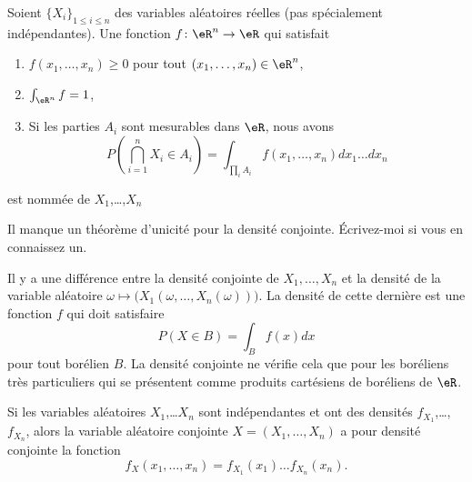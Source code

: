 \begin{definition}      \label{DefFonrepConj}
	Soient \( \{ X_i \}_{1\leq i\leq n}\) des variables aléatoires réelles (pas spécialement indépendantes). Une fonction \( f\colon \eR^n\to \eR\) qui satisfait
	\begin{enumerate}
		\item
		      \( f(x_1,\ldots,x_n)\geq 0\) pour tout \( (x_1,\ldots,x_n)\in\eR^n\),
		\item
		      \( \int_{\eR^n}f=1\),
		\item       \label{ItemDefFonrepConjiii}
		      Si les parties \( A_i\) sont mesurables dans \( \eR\), nous avons
		      \begin{equation}
			      P(\bigcap_{i=1}^n X_i\in A_i)=\int_{\prod_i A_i}f(x_1,\ldots,x_n)dx_1\ldots dx_n
		      \end{equation}
	\end{enumerate}
	est nommée  de \( X_1\),\ldots,\( X_n\)
\end{definition}

\begin{probleme}		\label{PROBooPVIXooNLpmIn}
	Il manque un théorème d'unicité pour la densité conjointe. Écrivez-moi si vous en connaissez un.
\end{probleme}

\begin{normaltext}
	Il y a une différence entre la densité conjointe de \( X_1,\ldots,X_n\) et la densité de la variable aléatoire \( \omega\mapsto \big( X_1(\omega,\ldots,X_n(\omega)) \big)\). La densité de cette dernière est une fonction \( f\) qui doit satisfaire
	\begin{equation}
		P(X\in B)=\int_Bf(x)dx
	\end{equation}
	pour tout borélien \( B\). La densité conjointe ne vérifie cela que pour les boréliens très particuliers qui se présentent comme produits cartésiens de boréliens de \( \eR\).
\end{normaltext}

\begin{proposition}     \label{PropDensiteConjIndep}
	Si les variables aléatoires \( X_1\),\ldots \( X_n\) sont indépendantes et ont des densités \( f_{X_1}\),\ldots,\( f_{X_n}\), alors la variable aléatoire conjointe \( X=(X_1,\ldots,X_n)\) a pour densité conjointe la fonction
	\begin{equation}
		f_X(x_1,\ldots,x_n)=f_{X_1}(x_1)\ldots f_{X_n}(x_n).
	\end{equation}
\end{proposition}

